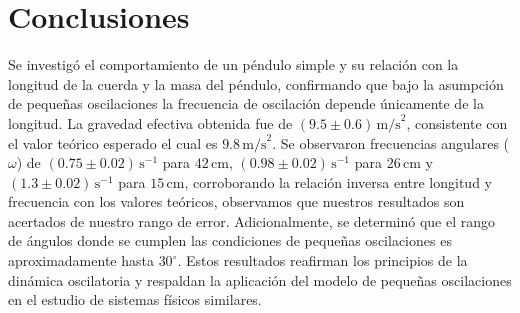 \documentclass[12pt,a4]{article}
\begin{document}
\section{Conclusiones}

Se investigó el comportamiento de un péndulo simple y su relación con la longitud de la cuerda y la masa del péndulo, confirmando que bajo la asumpción de pequeñas oscilaciones la frecuencia de oscilación depende únicamente de la longitud. La gravedad efectiva obtenida fue de \((9.5 \pm 0.6) \, \text{m/s}^2\), consistente con el valor teórico esperado el cual es \(9.8 \, \text{m/s}^2\). Se observaron frecuencias angulares (\(\omega\)) de \((0.75 \pm 0.02)\, \text{s}^{-1}\) para \(42 \, \text{cm}\), \((0.98 \pm 0.02) \, \text{s}^{-1}\) para \(26 \, \text{cm}\) y \((1.3 \pm 0.02) \, \text{s}^{-1}\) para \(15 \, \text{cm}\), corroborando la relación inversa entre longitud y frecuencia con los valores teóricos, observamos que nuestros resultados son acertados de nuestro rango de error. Adicionalmente, se determinó que el rango de ángulos donde se cumplen las condiciones de pequeñas oscilaciones es aproximadamente hasta $30^\circ$. Estos resultados reafirman los principios de la dinámica oscilatoria y respaldan la aplicación del modelo de pequeñas oscilaciones en el estudio de sistemas físicos similares.
\end{document}
